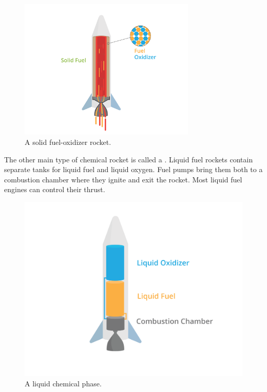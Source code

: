 \begin{figure}[htbp]
    \centering
	\includegraphics[width=0.75\textwidth]{solid.png}
    \caption{A solid fuel-oxidizer rocket.}
    \label{fig:solidfuel}
\end{figure}

The other main type of chemical rocket is called a . Liquid fuel rockets contain separate tanks for liquid fuel and liquid oxygen. Fuel pumps bring them both to a combustion chamber where they ignite and exit the rocket. Most liquid fuel engines can control their thrust. 

\begin{figure}[htbp]
    \centering
	\includegraphics[width=1\textwidth]{liquid.png}
    \caption{A liquid chemical phase.}
    \label{fig:liquidfuel}
\end{figure}


